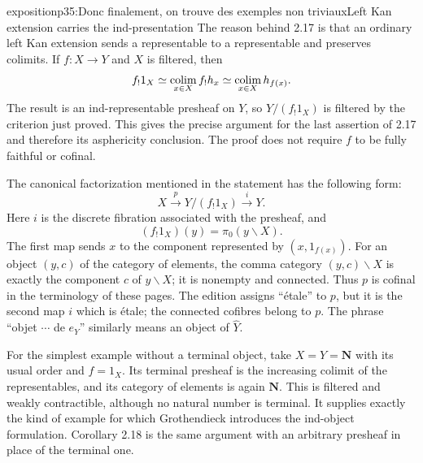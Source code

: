 \begin{dcomment}{exposition}{p35:Donc finalement, on trouve des exemples non triviaux}{Left Kan extension carries the ind-presentation}
The reason behind 2.17 is that an ordinary left Kan extension sends a representable to a representable and preserves colimits. If $f:X\to Y$ and $X$ is filtered, then
\[
 f_!1_X\simeq\mathop{\rm colim}_{x\in X}f_!h_x
          \simeq\mathop{\rm colim}_{x\in X}h_{f(x)}.
\]
The result is an ind-representable presheaf on $Y$, so $Y/(f_!1_X)$ is filtered by the criterion just proved. This gives the precise argument for the last assertion of 2.17 and therefore its asphericity conclusion. The proof does not require $f$ to be fully faithful or cofinal.

The canonical factorization mentioned in the statement has the following form:
\[
 X\xrightarrow{p}Y/(f_!1_X)\xrightarrow{i}Y.
\]
Here $i$ is the discrete fibration associated with the presheaf, and
\[
 (f_!1_X)(y)=\pi _0(y\backslash X).
\]
The first map sends $x$ to the component represented by $(x,1_{f(x)})$. For an object $(y,c)$ of the category of elements, the comma category $(y,c)\backslash X$ is exactly the component $c$ of $y\backslash X$; it is nonempty and connected. Thus $p$ is cofinal in the terminology of these pages. The edition assigns ``\'etale'' to $p$, but it is the second map $i$ which is \'etale; the connected cofibres belong to $p$. The phrase ``objet $\cdots$ de $e_Y$'' similarly means an object of $\widehat Y$.

For the simplest example without a terminal object, take $X=Y=\mathbf N$ with its usual order and $f=1_X$. Its terminal presheaf is the increasing colimit of the representables, and its category of elements is again $\mathbf N$. This is filtered and weakly contractible, although no natural number is terminal. It supplies exactly the kind of example for which Grothendieck introduces the ind-object formulation. Corollary 2.18 is the same argument with an arbitrary presheaf in place of the terminal one.
\end{dcomment}



